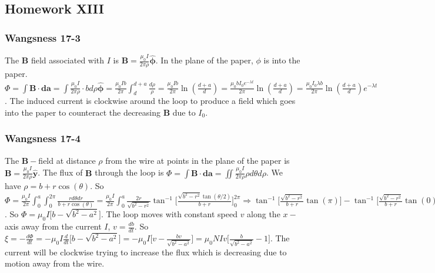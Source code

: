 \documentclass[oneside]{book}
\theoremstyle{definition}
\newcommand*\B[1]{\mathbf{#1}}
\newcommand*\Bh[1]{\mathbf{\hat{#1}}}
\begin{document}
\subsection*{Homework XIII}

\subsubsection{Wangsness 17-3}

The $\B{B}$ field associated with $I$ is $\B{B} = \frac{\mu_0 I}{2\pi \rho} \Bh{\phi}$. In the plane of the paper, $\phi$ is into the paper. $\Phi = \int \B{B}\cdot \B{da} = \int \frac{\mu_0 I}{2\pi \rho} \cdot b d\rho \Bh{\phi} = \frac{\mu_0Ib}{2\pi} \int_{d}^{d+a} \frac{d\rho}{\rho}= \frac{\mu_0 Ib}{2\pi} \ln(\frac{d+a}{d}) = \frac{\mu_0 bI_0 e^{-\lambda t}}{2\pi} \ln(\frac{d+a}{d}) = \frac{\mu_0 I_0 \lambda b}{2\pi} \ln(\frac{d+a}{d})e^{-\lambda t}$. The induced current is clockwise around the loop to produce a field which goes into the paper to counteract the decreasing $\B{B}$ due to $I_0$.

\subsubsection{Wangsness 17-4}

The $\B{B}-$field at distance $\rho$ from the wire at points in the plane of the paper is $\B{B} = \frac{\mu_0 I}{2\pi \rho} \Bh{y}$. The flux of $\B{B}$ through the loop is $\Phi = \int \B{B}\cdot \B{da} = \iint \frac{\mu_0 I}{2\pi \rho}\rho d\theta d\rho$. We have $\rho = b+r\cos(\theta)$. So $\Phi = \frac{\mu_0 I}{2\pi} \int_{0}^{a} \int_{0}^{2\pi} \frac{r d\theta dr}{b+r\cos(\theta)} = \frac{\mu_0 I}{2\pi} \int_{0}^{a} \frac{2r}{\sqrt{b^2-r^2}}\tan^{-1}\big[\frac{\sqrt{b^2-r^2}\tan(\theta/2)}{b+r}\big]_{0}^{2\pi} \Rightarrow \tan^{-1}\big[\frac{\sqrt{b^2-r^2}}{b+r}\tan(\pi)\big] - \tan^{-1}\big[ \frac{\sqrt{b^2-r^2}}{b+r}\tan(0)\big]$. So $\Phi = \mu_0 I\big[b-\sqrt{b^2-a^2}\big]$. The loop moves with constant speed $v$ along the $x-$axis away from the current $I$, $v = \frac{db}{dt}$. So $\xi = -\frac{d\Phi}{dt} = -\mu_0 I \frac{d}{dt}\big[b-\sqrt{b^2-a^2}\big] = -\mu_0 I\big[ v-\frac{bv}{\sqrt{b^2-a^2}}\big] = \mu_0 NIv\big[ \frac{b}{\sqrt{b^2-a^2}}-1\big]$. The current will be clockwise trying to increase the flux which is decreasing due to motion away from the wire.

\begin{figure}[!h]
  \centering
\end{figure}
\end{document}
